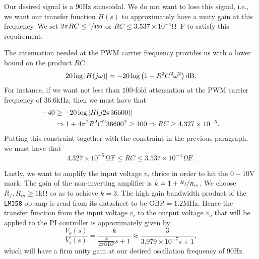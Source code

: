 Our desired signal is a $90$\unit{\hertz} sinusoidal. We do not want to lose
this signal, i.e., we want our transfer function $H(s)$ to approximately have a
unity gain at this frequency. We set $2\pi RC \leq \nicefrac{1}{450}$ or $RC
\leq 3.537 \times 10^{-4}$\unit{\ohm\farad} to satisfy this requirement. 

The attenuation needed at the PWM carrier frequency provides us with a lower
bound on the product $RC$. \[ 20 \log{\abs{H(j\omega)}} = -20 \log{\left(1 +
R^2C^2\omega^2\right)}\,\unit{\decibel}. \] For instance, if we want not less
than $100$-fold attenuation at the PWM carrier frequency of
$36.6$\unit{\kilo\hertz}, then we must have that 
%
\begin{align*}
    -40 &\geq -20 \log{\left|{H(j2\pi 36600)}\right|} \\ 
    &\Rightarrow 1 + 4 \pi^2 R^2C^236600^2 \geq 100
    \Rightarrow RC \geq 4.327 \times 10^{-5}.
\end{align*}
%
Putting this constraint together with the constraint in the previous paragraph,
we must have that 
%
\begin{equation}
    4.327 \times 10^{-5}\,\unit{\ohm\farad} \leq RC \leq 3.537 \times
    10^{-4}\,\unit{\ohm\farad}.
    \label{eq:rc_req}
\end{equation}


Lastly, we want to amplify the input voltage $v_i$ thrice in order to hit the
$0-10$\unit{\volt} mark. The gain of the non-inverting amplifier is $k = 1 +
\nicefrac{R_f}{R_{in}}$. We choose $R_f, R_{in} \geq 1$\unit{\kilo\ohm} so as to
achieve $k = 3$. The high gain bandwidth product of the \texttt{LM358} op-amp is
read from its datasheet to be $\text{GBP} = 1.2$\unit{\mega\hertz}. Hence the
transfer function from the input voltage $v_i$ to the output voltage $v_o$ that
will be applied to the PI controller is approximately given by \[
    \frac{V_o(s)}{V_i(s)} = \frac{k}{\frac{k}{2\pi\text{GBP}}s + 1} \approx
\frac{3}{3.979\times 10^{-7}s + 1}, \] which will have a firm unity gain at our
desired oscillation frequency of $90$\unit{\hertz}.


